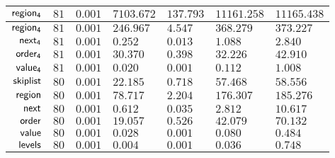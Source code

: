 {\begin{tabular}{|r||T||W|W|W||W|W||}
		$\mathsf{region_{4}}$		&  $81$ & $0.001$ &$7103.672$ & $137.793$ & $11161.258$ & $11165.438$ \\ \hline
		$\mathsf{region_{4}}$		&  $81$ & $0.001$ & $246.967$ &   $4.547$ &   $368.279$ &   $373.227$ \\ \hline
		$\mathsf{next_{4}}$			&  $81$ & $0.001$ &   $0.252$ &   $0.013$ &     $1.088$ &     $2.840$ \\ \hline
		$\mathsf{order_{4}}$			&  $81$ & $0.001$ &  $30.370$ &   $0.398$ &    $32.226$ &    $42.910$ \\ \hline
		$\mathsf{value_{4}}$			&  $81$ & $0.001$ &   $0.020$ &   $0.001$ &     $0.112$ &     $1.008$ \\ \hline \hline
		$\mathsf{skiplist}$			&  $80$ & $0.001$ &  $22.185$ &   $0.718$ &    $57.468$ &    $58.556$ \\ \hline
		$\mathsf{region}$			&  $80$ & $0.001$ &  $78.717$ &   $2.204$ &   $176.307$ &   $185.276$ \\ \hline
		$\mathsf{next}$				&  $80$ & $0.001$ &   $0.612$ &   $0.035$ &     $2.812$ &    $10.617$ \\ \hline
		$\mathsf{order}$				&  $80$ & $0.001$ &  $19.057$ &   $0.526$ &    $42.079$ &    $70.132$ \\ \hline
		$\mathsf{value}$				&  $80$ & $0.001$ &   $0.028$ &   $0.001$ &     $0.080$ &     $0.484$ \\ \hline
		$\mathsf{levels}$			&  $80$ & $0.001$ &   $0.004$ &   $0.001$ &     $0.036$ &     $0.748$ \\ \hline
	\end{tabular}
}
